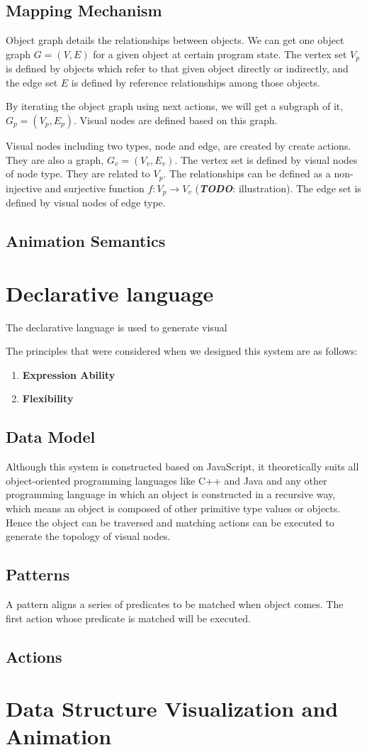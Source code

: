 \subsection {Mapping Mechanism}
Object graph details the relationships between objects. We can get one object graph \(G = (V, E)\) for a given object at certain program state. The vertex set $V_p$ is defined by objects which refer to that given object directly or indirectly, and the edge set $E$ is defined by reference relationships among those objects.

By iterating the object graph using next actions, we will get a subgraph of it, \(G_p = (V_p, E_p)\). Visual nodes are defined based on this graph. 

Visual nodes including two types, node and edge, are created by create actions. They are also a graph, \(G_v = (V_v, E_v)\). The vertex set is defined by visual nodes of node type. They are related to $V_p$. The relationships can be defined as a non-injective and surjective function \(f:V_p\rightarrow V_v\) (\textbf{\textit{TODO}}: illustration). The edge set is defined by visual nodes of edge type.

\subsection {Animation Semantics}

\section {Declarative language}
The declarative language is used to generate visual 

The principles that were considered when we designed this system are as follows:
\begin {enumerate}
\item \textbf {Expression Ability}
\item \textbf {Flexibility}
\end {enumerate}

\subsection {Data Model}
Although this system is constructed based on JavaScript, it theoretically suits all object-oriented programming languages like C++ and Java and any other programming language in which an object is constructed in a recursive way, which means an object is composed of other primitive type values or objects. Hence the object can be traversed and matching actions can be executed to generate the topology of visual nodes.

\subsection {Patterns}
A pattern aligns a series of predicates to be matched when object comes. The first action whose predicate is matched will be executed.

\subsection {Actions}

\section {Data Structure Visualization and Animation}
